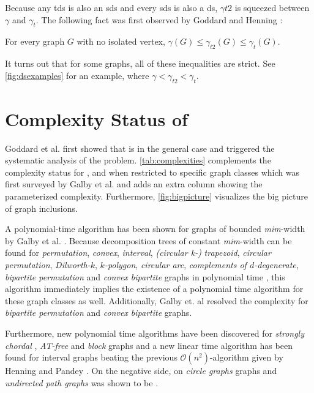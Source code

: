 Because any tds is also an sds and every sds is also a ds, $\gamma{t2}$ is squeezed between $\gamma$ and $\gamma_t$.
The  following fact was first observed by Goddard and Henning \cite{Goddard2014}:

\begin{fact}
For every graph $G$ with no isolated vertex, $\gamma(G) \leq \gamma_{t2}(G) \leq \gamma_t(G)$.
\end{fact}
It turns out that for some graphs, all of these inequalities are strict. See \cref{fig:dsexamples} for an example, where $\gamma < \gamma_{t2} < \gamma_t$.

\section{Complexity Status of \sdom}\label{ch:complexity-status}

Goddard et al. \cite{Goddard2014} first showed that \sdoms is \NPc in the general case and triggered the systematic analysis of the problem.  
\cref{tab:complexities} complements the complexity status for \DOM, \SDOM and \TDOM when restricted to specific graph classes which was first surveyed by Galby et al. \cite{Galby2020} and adds an extra column showing the parameterized complexity. 
Furthermore, \cref{fig:bigpicture} visualizes the big picture of graph inclusions.

A polynomial-time algorithm has been shown for graphs of bounded \textit{mim}-width by Galby et al. \cite{Galby2020}.
Because decomposition trees of constant \textit{mim}-width can be found for \textit{permutation}, \textit{convex}, \textit{interval}, \textit{(circular k-)} \textit{trapezoid}, \textit{circular permutation}, \textit{Dilworth-$k$}, \textit{$k$-polygon}, \textit{circular arc}, \textit{complements of $d$-degenerate}, \textit{bipartite permutation} and \textit{convex bipartite} graphs in polynomial time \cite{Belmonte2011}, this algorithm immediately implies the existence of a polynomial time algorithm for these graph classes as well. 
Additionally, Galby et. al resolved the complexity for \textit{bipartite permutation} and \textit{convex bipartite} graphs.

Furthermore, new polynomial time algorithms have been discovered for \textit{strongly chordal} \cite{Tripathi2021}, \textit{AT-free} \cite{Kloks2021} and \textit{block} \cite{Henning2022} graphs and a new linear time algorithm has been found for interval graphs \cite{Pradhan2021} beating the previous $\mathcal{O}(n^2)$-algorithm given by Henning and Pandey \cite{Henning2019}.
On the negative side, \sdom on \textit{circle graphs} \cite{Kloks2021} graphs and \textit{undirected path graphs} \cite{Henning2019} was shown to be \NPc.


